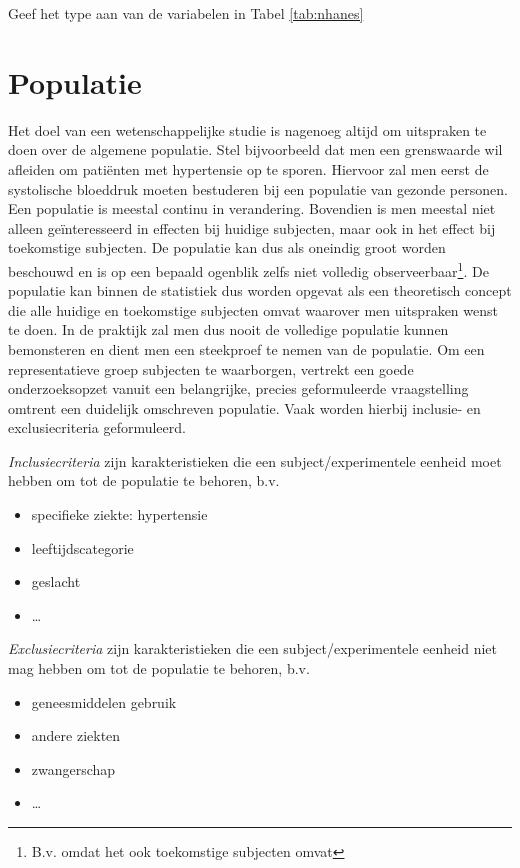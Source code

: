\documentclass[12pt,dutch,coursenotes]{book}
\providecommand{\tightlist}{%
  \setlength{\itemsep}{0pt}\setlength{\parskip}{0pt}}
\let\rmarkdownfootnote\footnote%
\def\footnote{\protect\rmarkdownfootnote}
\theoremstyle{definition}
\theoremstyle{definition}
\theoremstyle{definition}
\theoremstyle{remark}
\let\BeginKnitrBlock\begin \let\EndKnitrBlock\end
\begin{document}
\BeginKnitrBlock{example}[oefening]
\protect\hypertarget{exm:unnamed-chunk-3}{}{\label{exm:unnamed-chunk-3}
\iffalse (oefening) \fi{} }Geef het type aan van de variabelen in Tabel
\ref{tab:nhanes}
\EndKnitrBlock{example}

\section{Populatie}\label{subsec:pop}

Het doel van een wetenschappelijke studie is nagenoeg altijd om
uitspraken te doen over de algemene populatie. Stel bijvoorbeeld dat men
een grenswaarde wil afleiden om patiënten met hypertensie op te sporen.
Hiervoor zal men eerst de systolische bloeddruk moeten bestuderen bij
een populatie van gezonde personen. Een populatie is meestal continu in
verandering. Bovendien is men meestal niet alleen geïnteresseerd in
effecten bij huidige subjecten, maar ook in het effect bij toekomstige
subjecten. De populatie kan dus als oneindig groot worden beschouwd en
is op een bepaald ogenblik zelfs niet volledig observeerbaar\footnote{B.v.
  omdat het ook toekomstige subjecten omvat}. De populatie kan binnen de
statistiek dus worden opgevat als een theoretisch concept die alle
huidige en toekomstige subjecten omvat waarover men uitspraken wenst te
doen. In de praktijk zal men dus nooit de volledige populatie kunnen
bemonsteren en dient men een steekproef te nemen van de populatie. Om
een representatieve groep subjecten te waarborgen, vertrekt een goede
onderzoeksopzet vanuit een belangrijke, precies geformuleerde
vraagstelling omtrent een duidelijk omschreven populatie. Vaak worden
hierbij inclusie- en exclusiecriteria geformuleerd.

\emph{Inclusiecriteria} zijn karakteristieken die een
subject/experimentele eenheid moet hebben om tot de populatie te
behoren, b.v.

\begin{itemize}
\tightlist
\item
  specifieke ziekte: hypertensie
\item
  leeftijdscategorie
\item
  geslacht
\item
  \ldots{}
\end{itemize}

\emph{Exclusiecriteria} zijn karakteristieken die een
subject/experimentele eenheid niet mag hebben om tot de populatie te
behoren, b.v.

\begin{itemize}
\tightlist
\item
  geneesmiddelen gebruik
\item
  andere ziekten
\item
  zwangerschap
\item
  \ldots{}
\end{itemize}
\end{document}
